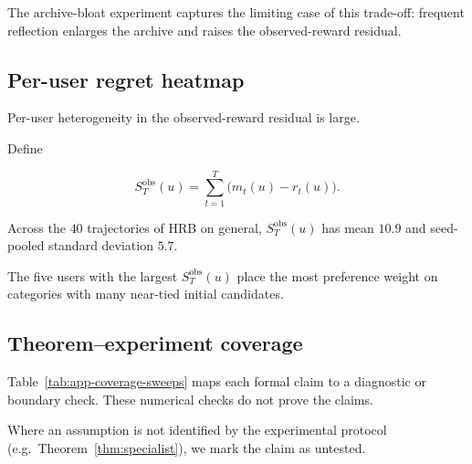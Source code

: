 \documentclass{article} %
\begin{document}
The archive-bloat experiment captures the limiting case of this trade-off: frequent reflection enlarges the archive and raises the observed-reward residual.

\subsection{Per-user regret heatmap}

\label{app:per-user-regret}

Per-user heterogeneity in the observed-reward residual is large.

Define

\begin{equation}
\label{eq:app-per-user-residual}
S_T^{\mathrm{obs}}(u)
=
\sum_{t=1}^{T}\big(m_t(u)-r_t(u)\big).
\end{equation}

Across the \(40\) trajectories of HRB on general,
\(S_T^{\mathrm{obs}}(u)\) has mean \(10.9\) and seed-pooled standard deviation
\(5.7\).

The five users with the largest \(S_T^{\mathrm{obs}}(u)\) place the most
preference weight on categories with many near-tied initial candidates.

\subsection{Theorem--experiment coverage}

\label{app:coverage-map}

Table~\ref{tab:app-coverage-sweeps} maps each formal claim to a diagnostic or
boundary check. These numerical checks do not prove the claims.

Where an assumption is not identified by the experimental protocol (e.g.\ Theorem~\ref{thm:specialist}), we mark the claim as untested.
\end{document}
